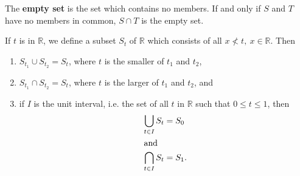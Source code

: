 \documentclass[12pt]{article}
\begin{document}
\begin{defn}
  The \textbf{empty set} is the set which contains no members. If and only if $S$ and
  $T$ have no members in common, $S \cap T$ is the empty set.
\end{defn}

\begin{exm}
  If $t$ is in $\mathbb{R}$, we define a subset $S_t$ of $\mathbb{R}$ which consists
  of all $x \nless t,\ x \in \mathbb{R}$. Then
  \begin{enumerate}
    \item
      $S_{t_1} \cup S_{t_2} = S_t$, where $t$ is the smaller of $t_1$ and $t_2$,
    \item
      $S_{t_1} \cap S_{t_2} = S_t$, where $t$ is the larger of $t_1$ and $t_2$, and
    \item
      if $I$ is the unit interval, i.e. the set of all $t$ in $\mathbb{R}$ such that
      $0 \leq t \leq 1$, then
      \begin{align*}
        \bigcup_{t \in I}S_t &= S_0\\
        \shortintertext{and}
        \bigcap_{t \in I}S_t &= S_1.
      \end{align*}
  \end{enumerate}
\end{exm}
\end{document}
